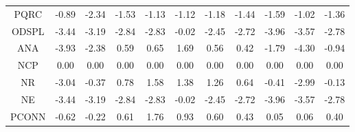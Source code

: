 \begin{longtable}{ | c || c | c | c | c | c | c | c | c | c || c |}
PQRC &  \cellcolor[HTML]{FFE7E7} -0.89 &  \cellcolor[HTML]{FFC7C7} -2.34 &  \cellcolor[HTML]{FFD7D7} -1.53 &  \cellcolor[HTML]{FFDFDF} -1.13 &  \cellcolor[HTML]{FFDFDF} -1.12 &  \cellcolor[HTML]{FFDFDF} -1.18 &  \cellcolor[HTML]{FFD7D7} -1.44 &  \cellcolor[HTML]{FFD7D7} -1.59 &  \cellcolor[HTML]{FFE7E7} -1.02 &  \cellcolor[HTML]{FFDFDF} -1.36 \\
ODSPL &  \cellcolor[HTML]{FFA7A7} -3.44 &  \cellcolor[HTML]{FFAFAF} -3.19 &  \cellcolor[HTML]{FFB7B7} -2.84 &  \cellcolor[HTML]{FFB7B7} -2.83 &  \cellcolor[HTML]{FFFFFF} -0.02 &  \cellcolor[HTML]{FFBFBF} -2.45 &  \cellcolor[HTML]{FFB7B7} -2.72 &  \cellcolor[HTML]{FF9F9F} -3.96 &  \cellcolor[HTML]{FFA7A7} -3.57 &  \cellcolor[HTML]{FFB7B7} -2.78 \\
ANA &  \cellcolor[HTML]{FF9F9F} -3.93 &  \cellcolor[HTML]{FFC7C7} -2.38 &  \cellcolor[HTML]{EFEFFF} 0.59 &  \cellcolor[HTML]{EFEFFF} 0.65 &  \cellcolor[HTML]{D7D7FF} 1.69 &  \cellcolor[HTML]{EFEFFF} 0.56 &  \cellcolor[HTML]{F7F7FF} 0.42 &  \cellcolor[HTML]{FFCFCF} -1.79 &  \cellcolor[HTML]{FF8F8F} -4.30 &  \cellcolor[HTML]{FFE7E7} -0.94 \\
NCP &  \cellcolor[HTML]{FFFFFF} 0.00 &  \cellcolor[HTML]{FFFFFF} 0.00 &  \cellcolor[HTML]{FFFFFF} 0.00 &  \cellcolor[HTML]{FFFFFF} 0.00 &  \cellcolor[HTML]{FFFFFF} 0.00 &  \cellcolor[HTML]{FFFFFF} 0.00 &  \cellcolor[HTML]{FFFFFF} 0.00 &  \cellcolor[HTML]{FFFFFF} 0.00 &  \cellcolor[HTML]{FFFFFF} 0.00 &  \cellcolor[HTML]{FFFFFF} 0.00 \\
NR &  \cellcolor[HTML]{FFAFAF} -3.04 &  \cellcolor[HTML]{FFF7F7} -0.37 &  \cellcolor[HTML]{EFEFFF} 0.78 &  \cellcolor[HTML]{D7D7FF} 1.58 &  \cellcolor[HTML]{DFDFFF} 1.38 &  \cellcolor[HTML]{DFDFFF} 1.26 &  \cellcolor[HTML]{EFEFFF} 0.64 &  \cellcolor[HTML]{FFF7F7} -0.41 &  \cellcolor[HTML]{FFB7B7} -2.99 &  \cellcolor[HTML]{FFFFFF} -0.13 \\
NE &  \cellcolor[HTML]{FFA7A7} -3.44 &  \cellcolor[HTML]{FFAFAF} -3.19 &  \cellcolor[HTML]{FFB7B7} -2.84 &  \cellcolor[HTML]{FFB7B7} -2.83 &  \cellcolor[HTML]{FFFFFF} -0.02 &  \cellcolor[HTML]{FFBFBF} -2.45 &  \cellcolor[HTML]{FFB7B7} -2.72 &  \cellcolor[HTML]{FF9F9F} -3.96 &  \cellcolor[HTML]{FFA7A7} -3.57 &  \cellcolor[HTML]{FFB7B7} -2.78 \\
PCONN &  \cellcolor[HTML]{FFEFEF} -0.62 &  \cellcolor[HTML]{FFF7F7} -0.22 &  \cellcolor[HTML]{EFEFFF} 0.61 &  \cellcolor[HTML]{CFCFFF} 1.76 &  \cellcolor[HTML]{E7E7FF} 0.93 &  \cellcolor[HTML]{EFEFFF} 0.60 &  \cellcolor[HTML]{F7F7FF} 0.43 &  \cellcolor[HTML]{FFFFFF} 0.05 &  \cellcolor[HTML]{FFFFFF} 0.06 &  \cellcolor[HTML]{F7F7FF} 0.40 \\

\end{longtable}
